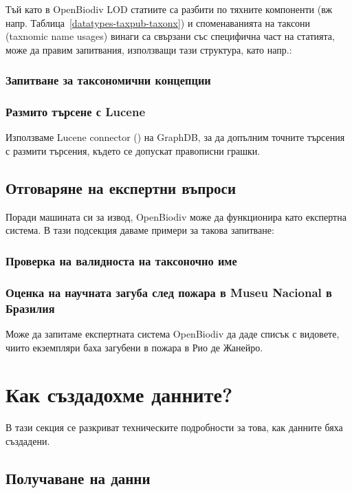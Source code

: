 Тъй като в OpenBiodiv LOD статиите са разбити по тяхните компоненти (вж напр. Таблица~\ref{datatypes-taxpub-taxonx}) и споменаванията на таксони (taxnomic name usages) винаги са свързани със специфична част на статията, може да правим запитвания, използващи тази структура, като напр.:

\subsubsection{Запитване за таксономични концепции}

\subsubsection{Размито търсене с Lucene}

Използваме Lucene connector (\cite{ontotext_graphdb_2018}) на GraphDB, за да допълним точните търсения с размити търсения, където се допускат правописни грашки.

\subsection{Отговаряне на експертни въпроси}

Поради машината си за извод, OpenBiodiv може да функционира като експертна система. В тази подсекция даваме примери за такова запитване:

\subsubsection{Проверка на валидноста на таксоночно име}

\subsubsection{Оценка на научната загуба след пожара в Museu Nacional в Бразилия}

Може да запитаме експертната система OpenBiodiv да даде списък с видовете, чиито екземпляри баха загубени в пожара в Рио де Жанейро.

\section{Как създадохме данните?}

В тази секция се разкриват техническите подробности за това, как данните бяха създадени.

\subsection{Получаване на данни}

